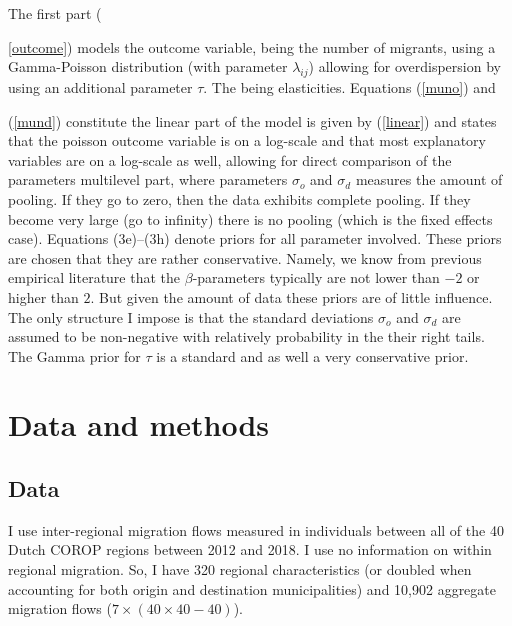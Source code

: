 \documentclass[fleqn,10pt]{SelfArx} %
\begin{document}
The first part ({\ref{outcome}) models the outcome variable, being the number of
  migrants, using a Gamma-Poisson distribution (with parameter $\lambda_{ij}$)
  allowing for overdispersion by using an additional parameter $\tau$. The being
  elasticities. Equations (\ref{muno}) and {(\ref{mund}) constitute the linear
    part of the model is given by (\ref{linear}) and states that the poisson
    outcome variable is on a log-scale and that most explanatory variables are
    on a log-scale as well, allowing for direct comparison of the parameters
    multilevel part, where parameters $\sigma_o$ and $\sigma_d$ measures the
    amount of pooling. If they go to zero, then the data exhibits complete
    pooling. If they become very large (go to infinity) there is no pooling
    (which is the fixed effects case). Equations (3e)--(3h) denote priors for
    all parameter involved. These priors are chosen that they are rather
    conservative. Namely, we know from previous empirical literature that the
    $\beta$-parameters typically are not lower than $-2$ or higher than $2$. But
    given the amount of data these priors are of little influence. The only
    structure I impose is that the standard deviations $\sigma_o$ and $\sigma_d$
    are assumed to be non-negative with relatively probability in the their
    right tails. The Gamma prior for $\tau$ is a standard and as well a very
    conservative prior.

\section{Data and methods}

\subsection{Data}

I use inter-regional migration flows measured in individuals between
all of the 40 Dutch COROP regions between 2012 and 2018. I use no information on
within regional migration. So, I have 320 regional
characteristics (or doubled when accounting for both origin and destination
municipalities) and 10,902 aggregate migration flows ($7 \times (40 \times 40 - 40)$).

}}
\end{document}
